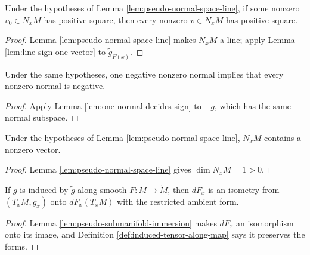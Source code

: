 \begin{lemma}
\label{lem:one-normal-decides-sign}
\leanok
{}
Under the hypotheses of Lemma \ref{lem:pseudo-normal-space-line}, if some nonzero $v_0\in N_xM$ has positive square, then every nonzero $v\in N_xM$ has positive square.
\end{lemma}
\begin{proof}
\leanok
{}
\sketch Lemma \ref{lem:pseudo-normal-space-line} makes $N_xM$ a line; apply Lemma \ref{lem:line-sign-one-vector} to $\widetilde g_{F(x)}$.
\end{proof}

\begin{lemma}
\label{lem:one-normal-decides-sign-neg}
\leanok
{}
Under the same hypotheses, one negative nonzero normal implies that every nonzero normal is negative.
\end{lemma}
\begin{proof}
\leanok
{}
\sketch Apply Lemma \ref{lem:one-normal-decides-sign} to $-\widetilde g$, which has the same normal subspace.
\end{proof}

\begin{lemma}
\label{lem:exists-nonzero-normal}
\leanok
{}
Under the hypotheses of Lemma \ref{lem:pseudo-normal-space-line}, $N_xM$ contains a nonzero vector.
\end{lemma}
\begin{proof}
\leanok
{}
\sketch Lemma \ref{lem:pseudo-normal-space-line} gives $\dim N_xM=1>0$.
\end{proof}

\begin{lemma}
\label{lem:differential-isometry-tangent-range}
\leanok
{}
If $g$ is induced by $\widetilde g$ along smooth $F:M\to\widetilde M$, then $dF_x$ is an isometry from $(T_xM,g_x)$ onto $dF_x(T_xM)$ with the restricted ambient form.
\end{lemma}
\begin{proof}
\leanok
{}
\sketch Lemma \ref{lem:pseudo-submanifold-immersion} makes $dF_x$ an isomorphism onto its image, and Definition \ref{def:induced-tensor-along-map} says it preserves the forms.
\end{proof}

